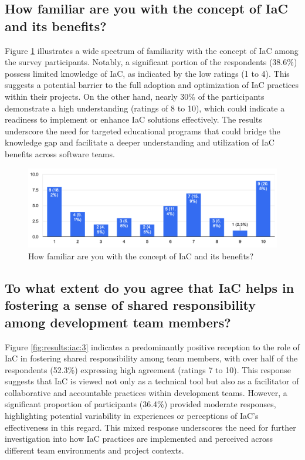 \subsection*{How familiar are you with the concept of IaC and its benefits?}
Figure \ref{fig:results:iac:2} illustrates a wide spectrum of familiarity with the concept of \ac{IaC} among the survey participants. Notably, a significant portion of the respondents (38.6\%) possess limited knowledge of \ac{IaC}, as indicated by the low ratings (1 to 4). This suggests a potential barrier to the full adoption and optimization of \ac{IaC} practices within their projects. On the other hand, nearly 30\% of the participants demonstrate a high understanding (ratings of 8 to 10), which could indicate a readiness to implement or enhance \ac{IaC} solutions effectively. The results underscore the need for targeted educational programs that could bridge the knowledge gap and facilitate a deeper understanding and utilization of \ac{IaC} benefits across software teams.
\begin{figure}[h!]
\centering
\includegraphics[width=\linewidth]{Images/Survey/iac_2.png}
\caption{How familiar are you with the concept of IaC and its benefits?}
\label{fig:results:iac:2}
\end{figure}

\pagebreak

\subsection*{To what extent do you agree that IaC helps in fostering a sense of shared responsibility among development team members?}

Figure \ref{fig:results:iac:3} indicates a predominantly positive reception to the role of \ac{IaC} in fostering shared responsibility among team members, with over half of the respondents (52.3\%) expressing high agreement (ratings 7 to 10). This response suggests that \ac{IaC} is viewed not only as a technical tool but also as a facilitator of collaborative and accountable practices within development teams. However, a significant proportion of participants (36.4\%) provided moderate responses, highlighting potential variability in experiences or perceptions of \ac{IaC}'s effectiveness in this regard. This mixed response underscores the need for further investigation into how \ac{IaC} practices are implemented and perceived across different team environments and project contexts.

